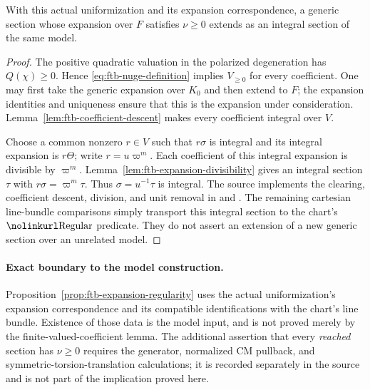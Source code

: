 \begin{srproposition}
\label{prop:ftb-expansion-regularity}
With this actual uniformization and its expansion correspondence, a
generic section whose expansion over \(F\) satisfies
\(\nu\ge0\) extends as an integral section of the same model.
\end{srproposition}
\begin{proof}
The positive quadratic valuation in the polarized degeneration has
\(Q(\chi)\ge0\).  Hence \eqref{eq:ftb-nuge-definition} implies
\(V_{\ge0}\) for every coefficient.
One may first take the generic expansion over \(K_0\) and then extend
to \(F\); the expansion identities and uniqueness ensure that this is
the expansion under consideration.
Lemma~\ref{lem:ftb-coefficient-descent} makes every coefficient integral
over \(V\).

Choose a common nonzero \(r\in V\) such that \(r\sigma\) is integral
and its integral expansion is \(r\Theta\); write \(r=u\varpi^m\).
Each coefficient of this integral expansion is divisible by
\(\varpi^m\).  Lemma~\ref{lem:ftb-expansion-divisibility} gives an
integral section \(\tau\) with
\(r\sigma=\varpi^m\tau\).
Thus \(\sigma=u^{-1}\tau\) is integral.
The source implements the clearing, coefficient descent, division,
and unit removal in
 and
.
The remaining cartesian line-bundle comparisons simply transport this
integral section to the chart's \(\srcid{Regular}\) predicate.
They do not assert an extension of a new generic section over an
unrelated model.
\end{proof}

\paragraph{Exact boundary to the model construction.}
Proposition~\ref{prop:ftb-expansion-regularity} uses the actual
uniformization's expansion correspondence and its compatible
identifications with the chart's line bundle.
Existence of those data is the model input, and is not proved merely
by the finite-valued-coefficient lemma.
The additional assertion that every \emph{reached} section has
\(\nu\ge0\) requires the generator, normalized CM pullback, and
symmetric-torsion-translation calculations; it is recorded separately
in the source and is not part of the implication proved here.

